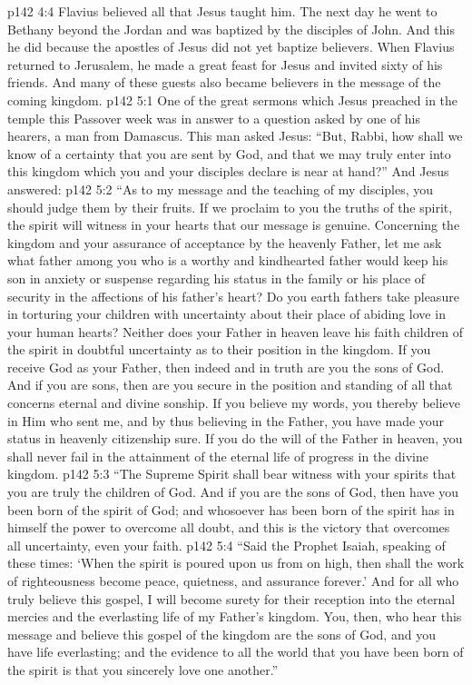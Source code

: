 \pc \vs p142 4:4 Flavius believed all that Jesus taught him. The next day he went to Bethany beyond the Jordan and was baptized by the disciples of John. And this he did because the apostles of Jesus did not yet baptize believers. When Flavius returned to Jerusalem, he made a great feast for Jesus and invited sixty of his friends. And many of these guests also became believers in the message of the coming kingdom.\plusone
{}
\vs p142 5:1 One of the great sermons which Jesus preached in the temple this Passover week was in answer to a question asked by one of his hearers, a man from Damascus. This man asked Jesus: “But, Rabbi, how shall we know of a certainty that you are sent by God, and that we may truly enter into this kingdom which you and your disciples declare is near at hand?” And Jesus answered:
\pc \vs p142 5:2 \textcolor{ubdarkred}{“As to my message and the teaching of my disciples, you should judge them by their fruits. If we proclaim to you the truths of the spirit, the spirit will witness in your hearts that our message is genuine. Concerning the kingdom and your assurance of acceptance by the heavenly Father, let me ask what father among you who is a worthy and kindhearted father would keep his son in anxiety or suspense regarding his status in the family or his place of security in the affections of his father’s heart? Do you earth fathers take pleasure in torturing your children with uncertainty about their place of abiding love in your human hearts? Neither does your Father in heaven leave his faith children of the spirit in doubtful uncertainty as to their position in the kingdom. If you receive God as your Father, then indeed and in truth are you the sons of God. And if you are sons, then are you secure in the position and standing of all that concerns eternal and divine sonship. If you believe my words, you thereby believe in Him who sent me, and by thus believing in the Father, you have made your status in heavenly citizenship sure. If you do the will of the Father in heaven, you shall never fail in the attainment of the eternal life of progress in the divine kingdom.}
\vs p142 5:3 \textcolor{ubdarkred}{“The Supreme Spirit shall bear witness with your spirits that you are truly the children of God. And if you are the sons of God, then have you been born of the spirit of God; and whosoever has been born of the spirit has in himself the power to overcome all doubt, and this is the victory that overcomes all uncertainty, even your faith.}
\vs p142 5:4 \textcolor{ubdarkred}{“Said the Prophet Isaiah, speaking of these times: ‘When the spirit is poured upon us from on high, then shall the work of righteousness become peace, quietness, and assurance forever.’ And for all who truly believe this gospel, I will become surety for their reception into the eternal mercies and the everlasting life of my Father’s kingdom. You, then, who hear this message and believe this gospel of the kingdom are the sons of God, and you have life everlasting; and the evidence to all the world that you have been born of the spirit is that you sincerely love one another.”}
